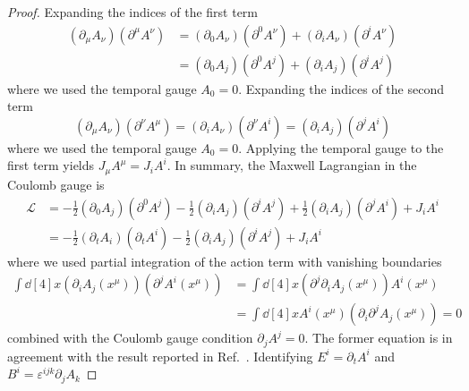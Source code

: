 \begin{proof}
	Expanding the indices of the first term
	\begin{equation*}
		\begin{split}
			\left(\partial_\mu A_\nu\right)
			\left(\partial^\mu A^\nu\right)
			&=
			\left(\partial_0 A_\nu\right)
			\left(\partial^0 A^\nu\right)
			+
			\left(\partial_i A_\nu\right)
			\left(\partial^i A^\nu\right)
			\\
			&=
			\left(\partial_0 A_j\right)
			\left(\partial^0 A^j\right)
			+
			\left(\partial_i A_j\right)
			\left(\partial^i A^j\right)
		\end{split}
	\end{equation*}
	where we used the temporal gauge $A_0=0$.
	Expanding the indices of the second term
	\begin{equation*}
		\left(\partial_\mu A_\nu\right)
		\left(\partial^\nu A^\mu\right)
		=
		\left(\partial_i A_\nu\right)
		\left(\partial^\nu A^i\right)
		=
		\left(\partial_i A_j\right)
		\left(\partial^j A^i\right)
	\end{equation*}
	where we used the temporal gauge $A_0=0$.
	Applying the temporal gauge to the first term yields $J_\mu A^\mu=J_i A^i$.
	In summary, the Maxwell Lagrangian in the Coulomb gauge is
	\begin{equation*}
		\begin{split}
			\mathcal{L}
			&=
			-
			\frac{1}{2}
			\left(\partial_0 A_j\right)
			\left(\partial^0 A^j\right)
			-
			\frac{1}{2}
			\left(\partial_i A_j\right)
			\left(\partial^i A^j\right)
			+
			\frac{1}{2}
			\left(\partial_i A_j\right)
			\left(\partial^j A^i\right)
			+
			J_i A^i
			\\
			&=
			-
			\frac{1}{2}
			\left(\partial_t A_i\right)
			\left(\partial_t A^i\right)
			-
			\frac{1}{2}
			\left(\partial_i A_j\right)
			\left(\partial^i A^j\right)
			+
			J_i A^i
		\end{split}
	\end{equation*}
	where we used partial integration of the action term with vanishing boundaries
	\begin{equation*}
		\begin{split}
			\int\dd[4]{x}
			\left(\partial_i A_j(x^\mu)\right)
			\left(\partial^j A^i(x^\mu)\right)
			&=
			\int\dd[4]{x}
			\left(\partial^j\partial_i A_j(x^\mu)\right)
			A^i(x^\mu)
			\\
			&=
			\int\dd[4]{x}
			A^i(x^\mu)
			\left(\partial_i\partial^jA_j(x^\mu)\right)
			=
			0
		\end{split}
	\end{equation*}
	combined with the Coulomb gauge condition $\partial_j A^j=0$.
	The former equation is in agreement with the result reported in Ref.~\cite[p.~340]{Srednicki2007}.
	Identifying $E^i=\partial_t A^i$ and $B^i=\varepsilon^{ijk}\partial_j A_k$
\end{proof}

